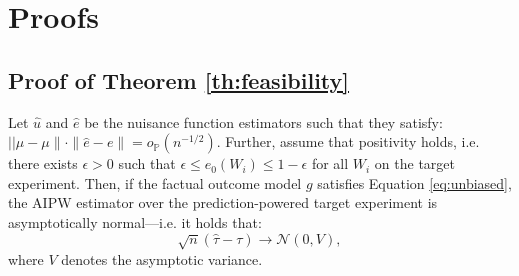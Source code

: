 \section{Proofs}
\label{sec:proofs}

\subsection{Proof of Theorem \ref{th:feasibility}}

\begin{theorembox}
\begin{theorem*}
Let $\hat u$ and $\hat e$ be the nuisance function estimators such that they satisfy: $||\hat{\mu} - \mu \| \cdot \| \hat{e} - e \| = o_{\mathbb P}(n^{-1/2})$. Further, assume that positivity holds, i.e. there exists $ \epsilon > 0 $ such that $ \epsilon \leq e_0(W_i) \leq 1 - \epsilon $ for all $ W_i $ on the target experiment. Then, if the factual outcome model $g$ satisfies Equation \ref{eq:unbiased}, the AIPW estimator over the prediction-powered target experiment is asymptotically normal---i.e. it holds that:
$$
\sqrt n (\hat \tau - \tau) \to \mathcal N (0, V), 
$$
where $V$ denotes the asymptotic variance. 



    
\end{theorem*}
\end{theorembox}
